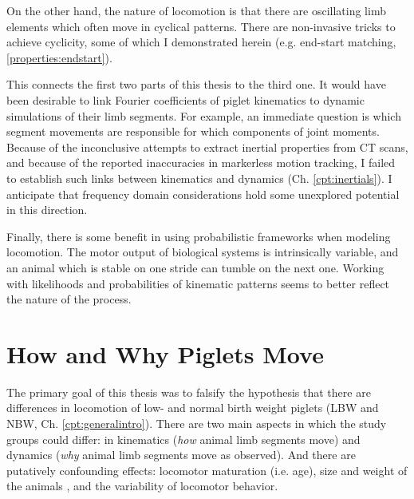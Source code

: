 \begin{change}
On the other hand, the nature of locomotion is that there are oscillating limb elements which often move in cyclical patterns.
There are non-invasive tricks to achieve cyclicity, some of which I demonstrated herein (e.g. end-start matching, \ref{properties:endstart}).


This connects the first two parts of this thesis to the third one.
It would have been desirable to link Fourier coefficients of piglet kinematics to dynamic simulations of their limb segments.
For example, an immediate question is which segment movements are responsible for which components of joint moments.
Because of the inconclusive attempts to extract inertial properties from CT scans, and because of the reported inaccuracies in markerless motion tracking, I failed to establish such links between kinematics and dynamics (Ch. \ref{cpt:inertials}).
I anticipate that frequency domain considerations hold some unexplored potential in this direction.


Finally, there is some benefit in using probabilistic frameworks when modeling locomotion.
The motor output of biological systems is intrinsically variable, and an animal which is stable on one stride can tumble on the next one.
Working with likelihoods and probabilities of kinematic patterns seems to better reflect the nature of the process.
\end{change}
\section{How and Why Piglets Move}
\label{sec:org533d919}
The primary goal of this thesis was to falsify the hypothesis that there are differences in locomotion of low- and normal birth weight piglets (LBW and NBW, Ch. \ref{cpt:generalintro}).
There are two main aspects in which the study groups could differ: in kinematics (\emph{how} animal limb segments move) and dynamics (\emph{why} animal limb segments move as observed).
And there are putatively confounding effects: locomotor maturation (i.e. age), size and weight of the animals \citep[i.e. physical appearance, cf.][]{Aerts2023}, and the variability of locomotor behavior.


